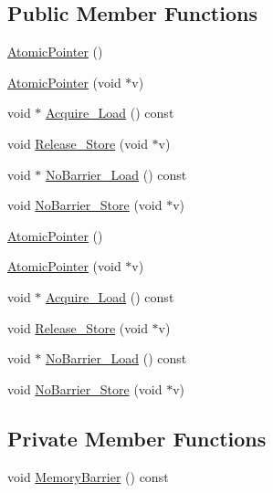 \subsection*{Public Member Functions}
\begin{DoxyCompactItemize}
\item 
\hyperlink{classleveldb_1_1port_1_1_atomic_pointer_a046bde8475164356d81353741b18a408}{Atomic\+Pointer} ()
\item 
\hyperlink{classleveldb_1_1port_1_1_atomic_pointer_aa8640431ad3d0ac2f0de62ef6090e89e}{Atomic\+Pointer} (void $\ast$v)
\item 
void $\ast$ \hyperlink{classleveldb_1_1port_1_1_atomic_pointer_a25b7cd07f114f6e59278d5523aff6140}{Acquire\+\_\+\+Load} () const 
\item 
void \hyperlink{classleveldb_1_1port_1_1_atomic_pointer_a8dfe51c125f71c09a363dae042be63a7}{Release\+\_\+\+Store} (void $\ast$v)
\item 
void $\ast$ \hyperlink{classleveldb_1_1port_1_1_atomic_pointer_ac11845e17d85f9de46b6c66979374f8f}{No\+Barrier\+\_\+\+Load} () const 
\item 
void \hyperlink{classleveldb_1_1port_1_1_atomic_pointer_aa7faab23777d1fe3c1a96d32a28ed20c}{No\+Barrier\+\_\+\+Store} (void $\ast$v)
\item 
\hyperlink{classleveldb_1_1port_1_1_atomic_pointer_a046bde8475164356d81353741b18a408}{Atomic\+Pointer} ()
\item 
\hyperlink{classleveldb_1_1port_1_1_atomic_pointer_aa8640431ad3d0ac2f0de62ef6090e89e}{Atomic\+Pointer} (void $\ast$v)
\item 
void $\ast$ \hyperlink{classleveldb_1_1port_1_1_atomic_pointer_a25b7cd07f114f6e59278d5523aff6140}{Acquire\+\_\+\+Load} () const 
\item 
void \hyperlink{classleveldb_1_1port_1_1_atomic_pointer_a8dfe51c125f71c09a363dae042be63a7}{Release\+\_\+\+Store} (void $\ast$v)
\item 
void $\ast$ \hyperlink{classleveldb_1_1port_1_1_atomic_pointer_ac11845e17d85f9de46b6c66979374f8f}{No\+Barrier\+\_\+\+Load} () const 
\item 
void \hyperlink{classleveldb_1_1port_1_1_atomic_pointer_aa7faab23777d1fe3c1a96d32a28ed20c}{No\+Barrier\+\_\+\+Store} (void $\ast$v)
\end{DoxyCompactItemize}
\subsection*{Private Member Functions}
\begin{DoxyCompactItemize}
\item 
void \hyperlink{classleveldb_1_1port_1_1_atomic_pointer_a2609d62ec5c9fe41a27f47ddd885272e}{Memory\+Barrier} () const 
\end{DoxyCompactItemize}
